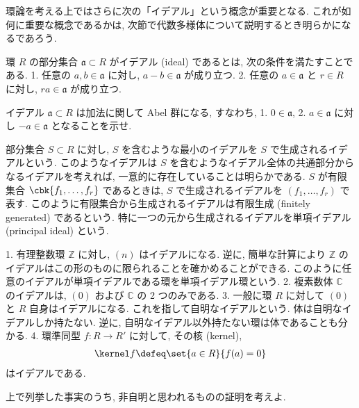 \documentclass[openany, a4paper, oneside]{jsbook}
\begin{document}
環論を考える上ではさらに次の「イデアル」という概念が重要となる.
これが如何に重要な概念であるかは, 次節で代数多様体について説明するとき明らかになるであろう.
\begin{defn}[イデアル]
環 $R$ の部分集合 $\mathfrak{a} \subset R$ がイデアル (ideal) であるとは, 次の条件を満たすことである.
1. 任意の $a,b \in \mathfrak{a}$ に対し,  $a-b \in \mathfrak{a}$ が成り立つ.
2. 任意の $a\in \mathfrak{a}$ と $r \in R$ に対し,  $ra \in \mathfrak{a}$ が成り立つ. \fin
\end{defn}
\begin{exercise}
イデアル $\mathfrak{a} \subset R$ は加法に関して Abel 群になる, すなわち,
1. $0 \in \mathfrak{a}$,
2. $a \in \mathfrak{a}$ に対し $-a \in \mathfrak{a}$
となることを示せ. \fin
\end{exercise}

\begin{defn}[生成されるイデアル]
部分集合 $S \subset R$ に対し, $S$ を含むような最小のイデアルを $S$ で生成されるイデアルという.
このようなイデアルは $S$ を含むようなイデアル全体の共通部分からなるイデアルを考えれば,
一意的に存在していることは明らかである.
$S$ が有限集合 $\cbk{f_1, \dots, f_r}$ であるときは, $S$ で生成されるイデアルを $(f_1, \dots, f_r)$ で表す.
このように有限集合から生成されるイデアルは有限生成 (finitely generated) であるという.
特に一つの元から生成されるイデアルを単項イデアル (principal ideal) という.
\end{defn}

\begin{ex}
1. 有理整数環 $\mathbb{Z}$ に対し, $(n)$ はイデアルになる.
   逆に, 簡単な計算により $\mathbb{Z}$ のイデアルはこの形のものに限られることを確かめることができる.
   このように任意のイデアルが単項イデアルである環を単項イデアル環という.
2. 複素数体 $\mathbb{C}$ のイデアルは, $(0)$ および $\mathbb{C}$ の 2 つのみである.
3. 一般に環 $R$ に対して $(0)$ と $R$ 自身はイデアルになる.
   これを指して自明なイデアルという.
   体は自明なイデアルしか持たない.
   逆に, 自明なイデアル以外持たない環は体であることも分かる.
4. 環準同型 $f : R \to R'$ に対して, その核 (kernel),
   \begin{align}
    \kernel f
    \defeq
    \set{a \in R}{f (a) = 0}
   \end{align}
   はイデアルである. \fin
\end{ex}
\begin{exercise}
上で列挙した事実のうち, 非自明と思われるものの証明を考えよ. \fin
\end{exercise}
\end{document}
